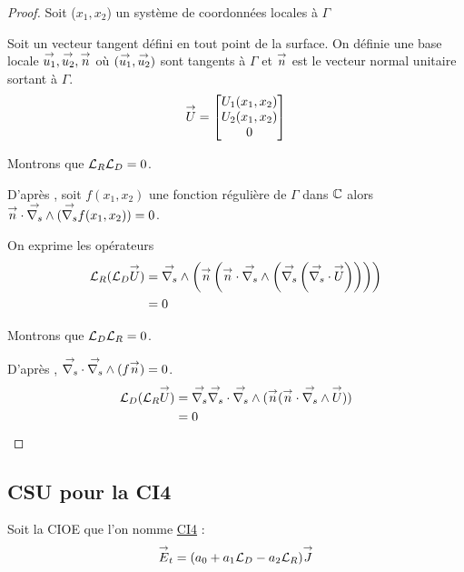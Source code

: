   \begin{proof}
    Soit (\(x_1,x_2\)) un système de coordonnées locales à \(\Gamma\)

    Soit un vecteur tangent défini en tout point de la surface. On définie une base locale \(\vect{u_1},\vect{u_2},\vect{n}\) où \((\vect{u_1},\vect{u_2})\) sont tangents à \(\Gamma\) et \(\vn\) est le vecteur normal unitaire sortant à \(\Gamma\).
    \[
      \vect{U} = 
      \begin{bmatrix}
        U_1(x_1,x_2)
        \\
        U_2(x_1,x_2)
        \\
        0
      \end{bmatrix}
    \]


    Montrons que \(\LR\LD = 0\).

    D’après \cite[p.~1029, A3.42]{bladel_electromagnetic_2007}, soit \(f(x_1,x_2)\) une fonction régulière de \(\Gamma\) dans \(\CC\) alors \(\vn \cdot \vrots(\vgrads f(x_1,x_2)) = 0\).

    On exprime les opérateurs
    \begin{align*}
      \LR(\LD \vect U)  &= \vrots \left(\vn \left(\vn \cdot \vrots \left( \vgrads \left(\vdivs \vect U\right)\right)\right)\right) \\
      &= 0
    \end{align*}

    Montrons que \(\LD\LR = 0\).

    D’après \cite[p.~1029, A3.43]{bladel_electromagnetic_2007}, \(\vdivs \vrots (f\vn) = 0\).
    \begin{align*}
      \LD(\LR \vect U) &= \vgrads \vdivs \vrots (\vn (\vn \cdot \vrots \vect U)) \\
      &= 0
    \end{align*}
  \end{proof}

\subsection{CSU pour la CI4}
  Soit la CIOE que l'on nomme \hyperlink{ci4}{CI4} :
  \begin{equation}
    \label{eq:unicite:ci4:ci4}
    \vE_t = (a_0 + a_1 \LD - a_2 \LR ) \vJ
  \end{equation}

